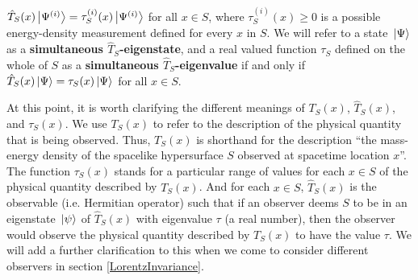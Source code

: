   $\hat{T}_S(x)\ket{\Psi^{(i)}}=\tau^{(i)}_S(x)\ket{\Psi^{(i)}}$ for all $x\in S$, where $\tau^{(i)}_S(x)\geq 0$ is a possible energy-density measurement defined for every $x$ in $S$. We will refer to a state $\ket*{\Psi}$ as a \textbf{simultaneous $\hat{T}_S$-eigenstate}, and a real valued function $\tau_S$ defined on the whole of $S$ as a  \textbf{simultaneous $\hat{T}_S$-eigenvalue} if and only if $\hat{T}_S(x)\ket*{\Psi}=\tau_S(x)\ket*{\Psi}$ for all $x\in S$.\label{simultaneous}

 At this point, it is worth clarifying the different meanings of $T_S(x)$, $\hat{T}_S(x)$, and $\tau_S(x)$.\label{TSclarification} We use $T_S(x)$ to refer to the description of the physical quantity that is being observed. Thus, $T_S(x)$ is shorthand for the description ``the mass-energy density of the spacelike hypersurface $S$ observed at spacetime location $x$''. The function $\tau_S(x)$ stands for a particular range of values for each $x\in S$ of the physical quantity described by $T_S(x)$. And for each $x\in S$, $\hat{T}_S(x)$ is the observable (i.e. Hermitian operator) such that if an observer deems $S$ to be in an eigenstate $\ket*{\psi}$ of  $\hat{T}_S(x)$ with eigenvalue $\tau$ (a real number), then the observer would observe the physical quantity described by  $T_S(x)$ to have the value $\tau$. We will add a further clarification to this when we come to consider different observers in section \ref{LorentzInvariance}.

